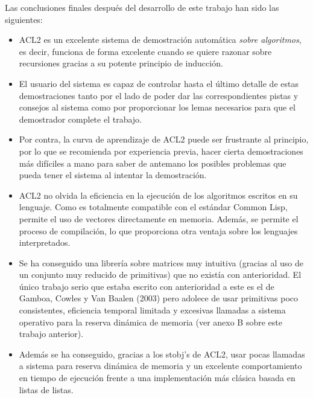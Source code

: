\documentclass[a4paper,10pt]{article}
\begin{document}
\par \vspace{10pt}

Las conclusiones finales después del desarrollo de este trabajo han sido las siguientes:

\par \vspace{10pt}

\begin{itemize}
	\item ACL2 es un excelente sistema de demostración automática \emph{sobre algoritmos}, es decir, funciona de forma excelente cuando se quiere razonar sobre recursiones gracias a su potente principio de inducción. 
	\item El usuario del sistema es capaz de controlar hasta el último detalle de estas demostraciones tanto por el lado de poder dar las correspondientes pistas y consejos al sistema como por proporcionar los lemas necesarios para que el demostrador complete el trabajo.
	\item Por contra, la curva de aprendizaje de ACL2 puede ser frustrante al principio, por lo que se recomienda por experiencia previa, hacer cierta demostraciones más difíciles a mano para saber de antemano los posibles problemas que pueda tener el sistema al intentar la demostración.
	\item ACL2 no olvida la eficiencia en la ejecución de los algoritmos escritos en su lenguaje. Como es totalmente compatible con el estándar Common Lisp, permite el uso de vectores directamente en memoria. Además, se permite el proceso de compilación, lo que proporciona otra ventaja sobre los lenguajes interpretados.
	\item Se ha conseguido una librería sobre matrices muy intuitiva (gracias al uso de un conjunto muy reducido de primitivas) que no existía con anterioridad. El único trabajo serio que estaba escrito con anterioridad a este es el de Gamboa, Cowles y Van Baalen (2003) pero adolece de usar primitivas poco consistentes, eficiencia temporal limitada y excesivas llamadas a sistema operativo para la reserva dinámica de memoria (ver anexo B sobre este trabajo anterior).
	\item Además se ha conseguido, gracias a los stobj's de ACL2, usar pocas llamadas a sistema para reserva dinámica de memoria y un excelente comportamiento en tiempo de ejecución frente a una implementación más clásica basada en listas de listas.
\end{itemize}
\end{document}
